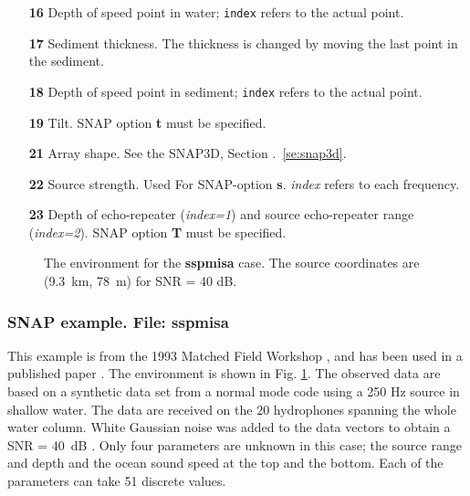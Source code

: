 \documentclass{saclantc}
\begin{document}
\begin{itemize}
    \item[\bf 16]  Depth of speed point  in water;
               {\tt index} refers to the actual point.
\vspace{-0.3cm}
    \item[\bf 17] Sediment thickness. The thickness is changed by moving the last 
point in the sediment. 
\vspace{-0.3cm}
    \item[\bf 18]  Depth of speed point  in sediment;
               {\tt index} refers to the actual point.
\vspace{-0.3cm}
    \item[\bf 19] Tilt. {\sf SNAP} option {\bf t} must be specified.
\vspace{-0.3cm}
    \item[\bf 21] Array shape. See the {\sc SNAP3D}, Section .~\ref{se:snap3d}.
\vspace{-0.3cm}
    \item[\bf 22] Source strength. Used For SNAP-option {\bf s}. {\it index} refers to each frequency. 
\vspace{-0.3cm}
    \item[\bf 23] Depth of echo-repeater ({\it index=1}) and source echo-repeater range ({\it index=2}). {\sf SNAP} option {\bf T} must be specified.
\end{itemize}

\begin{figure}
\epsfxsize=12cm
\centerline{}
\caption{The environment for the {\bf sspmisa} case.
The source coordinates are (9.3~km, 78~m) for SNR = 40 dB.} 
\label{fig:sspmis}
\end{figure}

\subsubsection{SNAP example. File: {\bf sspmisa}}
\label{se:ssp} This example is from the 1993  Matched Field Workshop
\cite{porter:jca94}, and has been used in a published paper 
\cite{gerstoft:jca94}.
The environment is shown in Fig. \ref{fig:sspmis}.
The observed data are based on a synthetic  data set from a normal mode
code using a 250 Hz source in shallow water. The data are received on
the 20 hydrophones spanning the whole water column. 
White Gaussian noise   was added to the data vectors to obtain a
SNR = 40~dB \cite{porter:jca94}. 
Only four parameters are unknown in this case; the source range and
depth and the ocean sound speed at the top and the bottom.
 Each of the parameters can take 51 discrete values.
\end{document}
